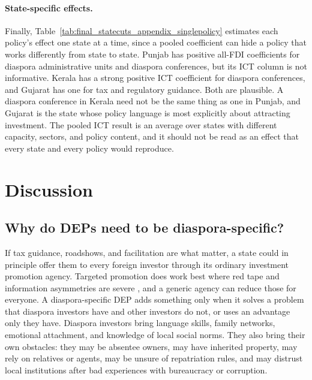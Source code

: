 \documentclass[12pt]{article}
\begin{document}
\paragraph{State-specific effects.} Finally, Table~\ref{tab:final_statecuts_appendix_singlepolicy} estimates each policy's effect one state at a time, since a pooled coefficient can hide a policy that works differently from state to state. Punjab has positive all-FDI coefficients for diaspora administrative units and diaspora conferences, but its ICT column is not informative. Kerala has a strong positive ICT coefficient for diaspora conferences, and Gujarat has one for tax and regulatory guidance. Both are plausible. A diaspora conference in Kerala need not be the same thing as one in Punjab, and Gujarat is the state whose policy language is most explicitly about attracting investment. The pooled ICT result is an average over states with different capacity, sectors, and policy content, and it should not be read as an effect that every state and every policy would reproduce.



\section{Discussion} \label{sec:discussion}

\subsection{Why do DEPs need to be diaspora-specific?}

If tax guidance, roadshows, and facilitation are what matter, a state could in principle offer them to every foreign investor through its ordinary investment promotion agency. Targeted promotion does work best where red tape and information asymmetries are severe \citep{harding_roll_2011}, and a generic agency can reduce those for everyone. A diaspora-specific DEP adds something only when it solves a problem that diaspora investors have and other investors do not, or uses an advantage only they have. Diaspora investors bring language skills, family networks, emotional attachment, and knowledge of local social norms. They also bring their own obstacles: they may be absentee owners, may have inherited property, may rely on relatives or agents, may be unsure of repatriation rules, and may distrust local institutions after bad experiences with bureaucracy or corruption.
\end{document}
